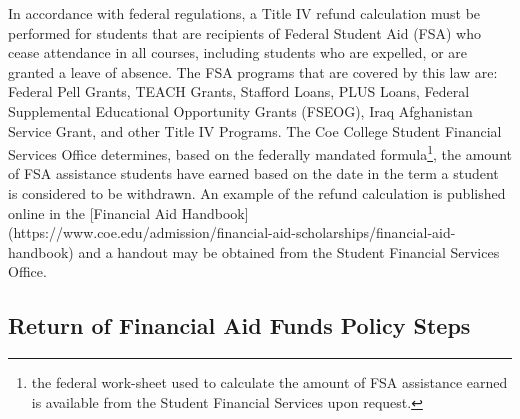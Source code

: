 \documentclass[
  letterpaper,
]{scrbook}
\begin{document}
In accordance with federal regulations, a Title IV refund calculation
must be performed for students that are recipients of Federal Student
Aid (FSA) who cease attendance in all courses, including students who
are expelled, or are granted a leave of absence. The FSA programs that
are covered by this law are: Federal Pell Grants, TEACH Grants, Stafford
Loans, PLUS Loans, Federal Supplemental Educational Opportunity Grants
(FSEOG), Iraq Afghanistan Service Grant, and other Title IV Programs.
The Coe College Student Financial Services Office determines, based on
the federally mandated formula\footnote{the federal work-sheet used to
  calculate the amount of FSA assistance earned is available from the
  Student Financial Services upon request.}, the amount of FSA
assistance students have earned based on the date in the term a student
is considered to be withdrawn. An example of the refund calculation is
published online in the {[}Financial Aid Handbook{]}
(https://www.coe.edu/admission/financial-aid-scholarships/financial-aid-handbook)
and a handout may be obtained from the Student Financial Services
Office.

\subsection{Return of Financial Aid Funds Policy
Steps}\label{return-of-financial-aid-funds-policy-steps}
\end{document}
